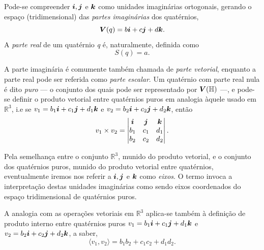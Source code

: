 


Pode-se compreender $\boldsymbol{i}, \boldsymbol{j}$ e $\boldsymbol{k}$ como unidades imagin\'arias ortogonais, gerando o espa\c co (tridimensional) das \emph{partes imagin\'arias} dos quat\'ernios,
\begin{equation}
\boldsymbol{V} (q) = b\boldsymbol{i} + c\boldsymbol{j} + d\boldsymbol{k}.
\end{equation}
A \emph{parte real} de um quat\'ernio \emph{q} \'e, naturalmente, definida como
\begin{equation}
S(q) = a.
\end{equation}

A parte imagin\'aria \'e comumente tamb\'em chamada de \emph{parte vetorial}, enquanto a parte real pode ser referida como \emph{parte escalar}. Um quat\'ernio com parte real nula \'e dito \emph{puro} --- o conjunto dos quais pode ser representado por $\boldsymbol{V}(\mathbb{H})$ ---, e pode-se definir o produto vetorial entre quat\'ernios puros em analogia \`aquele usado em $\mathbb{R}^3$, i.e se $v_1 = b_1\boldsymbol{i} + c_1\boldsymbol{j} + d_1\boldsymbol{k}$ e $v_2 = b_2\boldsymbol{i} + c_2\boldsymbol{j} + d_2\boldsymbol{k}$, ent\~ao
\begin{equation}
v_1 \times v_2 = 
\begin{vmatrix}
\boldsymbol{i} & \boldsymbol{j} & \boldsymbol{k}\\ 
b_1 & c_1 & d_1\\ 
b_2 & c_2 & d_2
\end{vmatrix}.
\end{equation}

Pela semelhan\c ca entre o conjunto $ \mathbb{R}^3 $, munido do produto vetorial, e o conjunto dos quat\'ernios puros, munido do produto vetorial entre quat\'ernios, eventualmente iremos nos referir a $\boldsymbol{i}, \boldsymbol{j}$ e $\boldsymbol{k}$ como \emph{eixos}. O termo invoca a interpreta\c c\~ao destas unidades imagin\'arias como sendo eixos coordenados do espa\c co tridimensional de quat\'ernios puros.

A analogia com as opera\c c\~oes vetoriais em $\mathbb{R}^3$ aplica-se tamb\'em \`a defini\c c\~ao de produto interno entre quat\'ernios puros $v_1 = b_1\boldsymbol{i} + c_1\boldsymbol{j} + d_1\boldsymbol{k}$ e $v_2 = b_2\boldsymbol{i} + c_2\boldsymbol{j} + d_2\boldsymbol{k}$, a saber,
\begin{equation}
\langle v_1, v_2 \rangle =
b_1 b_2 + c_1 c_2 + d_1 d_2.
\end{equation}

